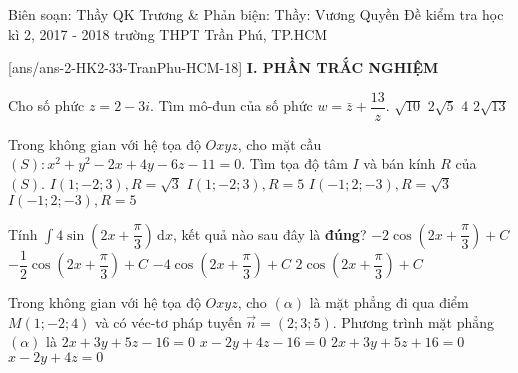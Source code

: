 
	\begin{name}
{Biên soạn: Thầy QK Trương \& Phản biện: Thầy: Vương Quyền}
		{Đề kiểm tra học kì 2, 2017 - 2018 trường THPT Trần Phú, TP.HCM}
	\end{name}
	\setcounter{ex}{0}\setcounter{bt}{0}
	[ans/ans-2-HK2-33-TranPhu-HCM-18]
\noindent\textbf{I. PHẦN TRẮC NGHIỆM}

\begin{ex}%
	Cho số phức $z=2-3i$. Tìm mô-đun của số phức $w=\bar{z}+\dfrac{13}{z}$.
	\choice
	{$\sqrt{10}$}
	{$2 \sqrt{5}$}
	{$4$}
	{\True $2 \sqrt{13}$}
\end{ex}

\begin{ex}%
	Trong không gian với hệ tọa độ $Oxyz$, cho mặt cầu $(S)\colon x^2+y^2-2x+4y-6z-11=0$. Tìm tọa độ tâm $I$ và bán kính $R$ của $(S)$.
	\choice
	{$I\left( 1;-2;3 \right),R=\sqrt{3}$}
	{\True $I\left(1; - 2; 3\right), R=5$}
	{$I\left(- 1; 2; - 3\right), R=\sqrt{3}$}
	{$I\left(- 1; 2; - 3\right), R=5$}
\end{ex}

\begin{ex}%
	Tính $\displaystyle\int{4\sin \left(2x + \dfrac{\pi}{3}\right)\mathrm{\,d}x}$, kết quả nào sau đây là \textbf{đúng}?
	\choice
	{\True $ - 2\cos \left(2x + \dfrac{\pi}{3}\right) + C$}
	{$ - \dfrac{1}{2}\cos \left(2x + \dfrac{\pi}{3}\right) + C$}
	{$ - 4\cos \left(2x + \dfrac{\pi}{3}\right) + C$}
	{$2\cos \left(2x + \dfrac{\pi}{3}\right) + C$}
\end{ex}

\begin{ex}%
	Trong không gian với hệ tọa độ $Oxyz$, cho $\left(\alpha\right)$ là mặt phẳng đi qua điểm $M\left(1; - 2; 4\right)$ và có véc-tơ pháp tuyến $\overrightarrow{n}=\left(2; 3; 5\right)$. Phương trình mặt phẳng $\left(\alpha\right)$ là 
	\choice
	{\True $2x + 3y + 5z - 16=0$}
	{$x - 2y + 4z - 16=0$}
	{$2x + 3y + 5z + 16=0$}
	{$x - 2y + 4z=0$}
\end{ex}

